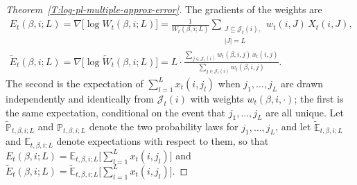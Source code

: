\documentclass[final]{statsoc}
\begin{document}
\begin{proof}[Theorem~\ref{T:log-pl-multiple-approx-error}]
The gradients of the weights are
\begin{subequations}
\begin{gather*}
    E_t(\beta, i; L)
        = \nabla \big[ \log W_t(\beta, i; L) \big]
        =
        \frac{1}{W_t(\beta, i; L)}
        \sum_{\substack{J \subseteq \mathcal{J}_t(i), \\
                        |J| = L}}\!
            w_t(i,J)
            \,
            X_t(i,J), \\
    \widetilde E_t(\beta, i; L)
        = \nabla \big[ \log \widetilde W_t(\beta, i; L) \big]
        =
        L
        \cdot
        \frac{
            \sum_{j \in \mathcal{J}_t(i)}
                w_t(\beta, i, j) \, x_t(i,j)
        }{
            \sum_{j \in \mathcal{J}_t(i)}
                w_t(\beta, i, j)
        }.
\end{gather*}
\end{subequations}
The second is the expectation of $\sum_{l = 1}^L x_t(i, j_l)$ when
$j_1, \ldots, j_L$ are drawn independently and identically from
$\mathcal{J}_t(i)$ with weights $w_t(\beta, i, \cdot)$; the first is the same
expectation, conditional on the event that $j_1, \ldots, j_L$ are all unique.
Let $\tilde{\mathbb{P}}_{t,\beta,i;L}$ and $\mathbb{P}_{t,\beta,i;L}$
denote the two probability laws for $j_1, \ldots, j_L$, and let
$\tilde{\mathbb{E}}_{t,\beta,i;L}$ and $\mathbb{E}_{t,\beta,i;L}$ denote
expectations with respect to them, so that
\(
    E_t(\beta,i;L)
        =
        \mathbb{E}_{t,\beta,i;L} \big[ \sum_{l=1}^L x_t(i,j_l)\big]
\)
and
\(
    \widetilde E_t(\beta,i;L)
    =
    \tilde{\mathbb{E}}_{t,\beta,i;L} \big[ \sum_{l=1}^L x_t(i,j_l)\big].
\)


\end{proof}
\end{document}
